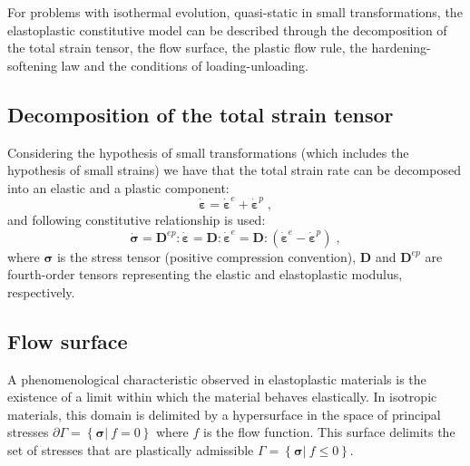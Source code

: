 \documentclass[Journal,letterpaper]{ascelike-new}
\newcommand{\Dsdee}{\boldsymbol{D}}
\newcommand{\Dsdep}{\boldsymbol{D}^{ep}}
\newcommand{\dstrain}{\boldsymbol{\dot{\varepsilon}}}
\newcommand{\dstraine}{\boldsymbol{\dot{\varepsilon}}^{e}}
\newcommand{\dstrainp}{\boldsymbol{\dot{\varepsilon}}^{p}}
\newcommand{\dstress}{\boldsymbol{\dot{\sigma}}}
\newcommand{\stress}{\boldsymbol{\sigma}}
\begin{document}
For problems with isothermal evolution, quasi-static in small transformations, the elastoplastic constitutive model can be described through the decomposition of the total strain tensor, the flow surface, the plastic flow rule, the hardening-softening law and the conditions of loading-unloading.

\subsection{Decomposition of the total strain tensor}

Considering the hypothesis of small transformations (which includes the hypothesis of small strains) we have that the total strain rate can be decomposed into an elastic and a plastic component:
\begin{equation} \label{eq_decomposition_plastic}
    \dstrain=\dstraine + \dstrainp\;,
\end{equation}
and following constitutive relationship is used:
\begin{equation} \label{eq_constitutive_relationship_plastic}
    \dstress = \Dsdep : \dstrain = \Dsdee : \dstraine = \Dsdee : (\dstraine - \dstrainp)\;,
\end{equation}
where $\stress$ is the stress tensor (positive compression convention), $\Dsdee$  and $\Dsdep$ are fourth-order tensors representing the elastic and elastoplastic modulus, respectively.

\subsection{Flow surface}

A phenomenological characteristic observed in elastoplastic
materials is the existence of a limit within which the material behaves elastically. In isotropic materials, this domain is delimited by a hypersurface in the space of principal stresses $\partial \Gamma = \left\{ \stress |~f = 0 \right\}$ where $f$ is the flow function. This surface delimits the set of stresses that are plastically admissible $\Gamma = \left\{ \stress | ~f \leq 0 \right\}$.
\end{document}
